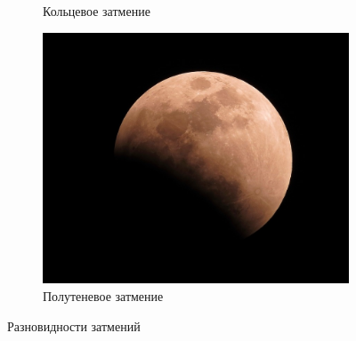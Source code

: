\documentclass{article}
\begin{document}
\begin{figure}[p]
\begin{subfigure}[b]{0.45\textwidth}
    	\caption{Кольцевое затмение} 
    \end{subfigure} 
    \begin{subfigure}[b]{0.29\textwidth} 								\includegraphics[width = \textwidth]{img/2} 
    	\caption{Полутеневое затмение} 
    \end{subfigure} 
    \caption{Разновидности затмений} 
    \label{pic:a}
    \end{figure}
\end{document}
